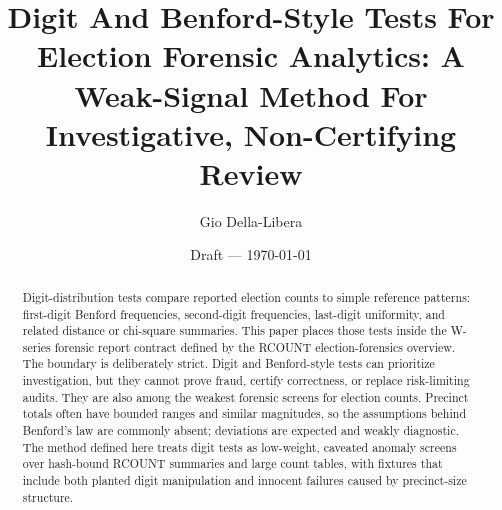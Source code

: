 \documentclass[12pt]{article}
\title{Digit And Benford-Style Tests For Election Forensic Analytics:
A Weak-Signal Method For Investigative, Non-Certifying Review}
\author{Gio Della-Libera}
\date{Draft --- \today}
\begin{document}
\maketitle

\begin{abstract}
Digit-distribution tests compare reported election counts to simple reference
patterns: first-digit Benford frequencies, second-digit frequencies,
last-digit uniformity, and related distance or chi-square summaries. This paper
places those tests inside the W-series forensic report contract defined by the
RCOUNT election-forensics overview. The boundary is deliberately strict. Digit
and Benford-style tests can prioritize investigation, but they cannot prove
fraud, certify correctness, or replace risk-limiting audits. They are also among
the weakest forensic screens for election counts. Precinct totals often have
bounded ranges and similar magnitudes, so the assumptions behind Benford's law
are commonly absent; deviations are expected and weakly diagnostic. The method
defined here treats digit tests as low-weight, caveated anomaly screens over
hash-bound RCOUNT summaries and large count tables, with fixtures that include
both planted digit manipulation and innocent failures caused by precinct-size
structure.
\end{abstract}








\nocite{rcount-overview-2026,w01-forensic-analytics-2026}


\end{document}
